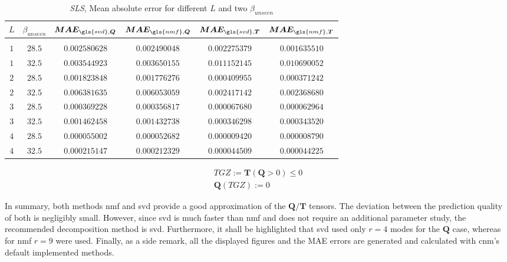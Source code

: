 \begin{table}[!h]
    \centering
    \begin{tabular}{c c| c c|  c c  }
        \textbf{$L$} &$\beta_{unseen}$
         & $\boldsymbol{MAE}_{\gls{svd}, \bm Q}$  
         &$\boldsymbol{MAE}_{\gls{nmf}, \bm Q}$ 
         & $\boldsymbol{MAE}_{\gls{svd}, \bm T}$  
         &$\boldsymbol{MAE}_{\gls{nmf}, \bm T}$ \\
        \hline \\
        [-0.8em]
         $1$  & $28.5$ 
         & $0.002580628 $ & $0.002490048$ 
         & $0.002275379 $ & $0.001635510$\\
         
         $1$  & $32.5$ 
         & $0.003544923$ & $0.003650155$ 
         & $0.011152145$ & $0.010690052$\\
         
         $2$  & $28.5$ 
         & $0.001823848$ & $0.001776276$ 
         & $0.000409955$ & $0.000371242$\\
         
         $2$  & $32.5$ 
         & $0.006381635$ & $0.006053059$ 
         & $0.002417142$ & $0.002368680$\\
         
         $3$  & $28.5$ 
         & $0.000369228$ & $0.000356817$ 
         & $0.000067680$ & $0.000062964$\\

         $3$  & $32.5$ 
         & $0.001462458$ & $0.001432738$ 
         & $0.000346298$ & $0.000343520$\\
         

         $4$  & $28.5$ 
         & $0.000055002$ & $0.000052682$ 
         & $0.000009420$ & $0.000008790$\\

         $4$  & $32.5$ 
         & $0.000215147$ & $0.000212329$ 
         & $0.000044509$ & $0.000044225$
    
    \end{tabular}
    \caption{\emph{SLS}, Mean absolute error for different $L$ and two $\beta_{unseen}$}
    \label{tab_7_NMF_SVD_QT}
\end{table}

\begin{equation}
    \begin{aligned}
        TGZ := \bm T ( \bm Q  > 0) \leq 0 \\
        \bm Q ( TGZ) := 0
    \end{aligned}
    \label{eq_33}
\end{equation}

In summary, both methods \gls{nmf} and \gls{svd} provide a good approximation of the $\bm Q / \bm T$ tensors.
The deviation between the prediction quality of both is negligibly small.
However, since \gls{svd} is much faster than \gls{nmf} and does not require an additional parameter study, the recommended decomposition method is \gls{svd}.
Furthermore, it shall be highlighted that \gls{svd} used only $r = 4$ modes for the $\bm Q$ case, whereas for \gls{nmf} $r=9$ were used. 
Finally, as a side remark, all the displayed figures and the MAE errors are generated and calculated with \gls{cnm}'s default implemented methods. 
\FloatBarrier